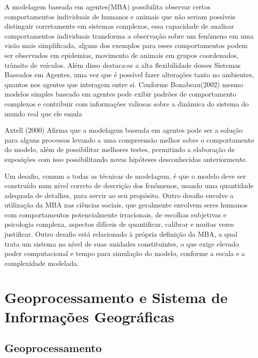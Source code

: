 A modelagem baseada em agentes(MBA) possibilita observar certos comportamentos individuais de humanos e animais que não seriam possíveis distinguir corretamente em sistemas complexos, essa capacidade de analisar comportamentos individuais transforma a observação sobre um fenômeno em uma visão mais simplificada, alguns dos exemplos para esses comportamentos podem ser observados em epidemias, movimento de animais em grupos coordenados, trânsito de veículos. Além disso destaca-se a alta flexibilidade desses Sistemas Baseados em Agentes, uma vez que é possível fazer alterações tanto no ambientes, quantos nos agentes que interagem entre si. Conforme Bonabeau(2002) mesmo modelos simples baseado em agentes pode exibir padrões de comportamento complexos e contribuir com informações valiosas sobre a dinâmica do sistema do mundo real que ele emula \cite{bonabeau2002agent}


Axtell (2000) Afirma que a modelagem baseada em agentes pode ser a solução para alguns processos levando a uma compreensão melhor sobre o comportamento do modelo, além de possibilitar melhores testes, permitindo a elaboração de suposições com isso possibilitando novas hipóteses desconhecidas anteriormente.\cite{Axtell:online}

Um desafio, comum a todas as técnicas de modelagem, é que o modelo deve ser construído num nível correto de descrição dos fenômenos, usando uma quantidade adequada de detalhes, para servir ao seu propósito. Outro desafio envolve a utilização da MBA nas ciências sociais, que geralmente envolvem seres humanos com comportamentos potencialmente irracionais, de escolhas subjetivas e psicologia complexa, aspectos difíceis de quantificar, calibrar e muitas vezes justificar. Outro desafio está relacionado à própria definição da MBA, a qual trata um sistema no nível de suas unidades constituintes, o que exige elevado poder computacional e tempo para simulação do modelo, conforme a escala e a complexidade modelada.

\section{Geoprocessamento e Sistema de Informações Geográficas}

\subsection{Geoprocessamento}

